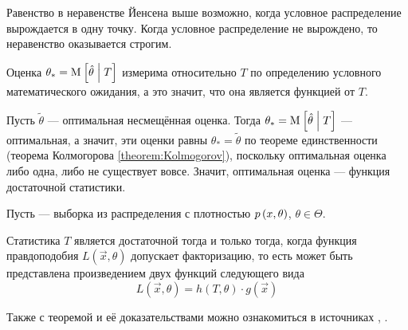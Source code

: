 \begin{remark}
  Равенство в неравенстве Йенсена выше возможно,
  когда условное распределение вырождается в одну точку.
  Когда условное распределение не вырождено,
  то неравенство оказывается строгим.
\end{remark}

\begin{remark}
  Оценка $\theta_* = \operatorname{M}_{} \left[ \hat{\theta} \;\middle|\; T \right]$ измерима относительно $T$
  по определению условного математического ожидания, а это значит,
  что она является функцией от $T$.

  Пусть $\tilde{\theta}$ --- оптимальная несмещённая оценка.
  Тогда $\theta_* = \operatorname{M}_{} \left[ \hat{\theta} \;\middle|\; T \right]$ --- оптимальная, а значит,
  эти оценки равны $\theta_* = \tilde{\theta}$ по теореме единственности
  (теорема Колмогорова \ref{theorem:Kolmogorov}),
  поскольку оптимальная оценка либо одна, либо не существует вовсе.
  Значит, оптимальная оценка --- функция достаточной статистики.
\end{remark}

\begin{theorem}
  Пусть \xsample --- выборка из распределения
  с плотностью $p\left(x,\theta\right)$, $\theta \in \Theta$.

  Статистика $T$ является достаточной тогда и только тогда, когда
  функция правдоподобия $L\left( \vec{x}, \theta \right)$
  допускает факторизацию, то есть может быть представлена
  произведением двух функций следующего вида
  $$L\left( \vec{x}, \theta \right)
      = h\left( T, \theta \right) \cdot g\left( \vec{x} \right)$$
\end{theorem}

\begin{remark}
  Также с теоремой и её доказательствами можно ознакомиться в источниках
  \cite[стр.~78]{MGTUXVII}, \cite[стр.~158]{BorovkovMS}.
\end{remark}

